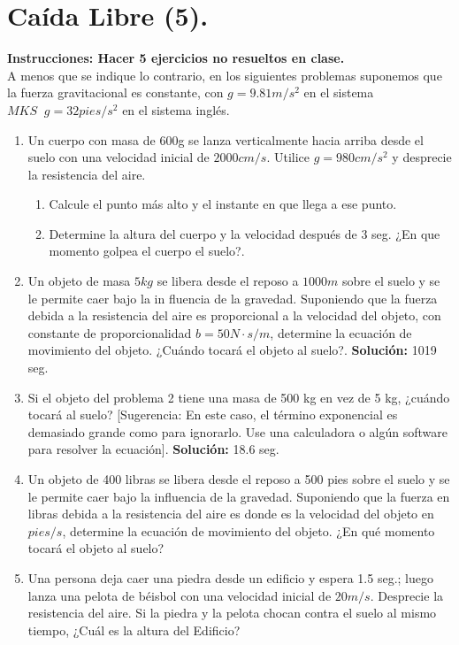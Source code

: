 \documentclass[letterpaper,10pt]{memoir}
\begin{document}
\section*{Caída Libre (5).} %
\textbf{Instrucciones: Hacer 5 ejercicios no resueltos en clase.}\\
A menos que se indique lo contrario, en los siguientes problemas suponemos que la fuerza gravitacional es constante, con \(g = 9.81 m/s ^2\) en el sistema \(MKS \;\;g = 32 pies/s ^2\) en el sistema inglés.
\begin{enumerate}
	\item Un cuerpo con masa de 600g se lanza verticalmente hacia arriba desde el suelo con una velocidad inicial de \(2000cm/s\). Utilice \(g=980cm/s ^2\) y desprecie la resistencia del aire.
		\begin{enumerate}
			\item Calcule el punto más alto y el instante en que llega a ese punto.
			\item Determine la altura del cuerpo y la velocidad después de \(3\) seg. ¿En que momento golpea el cuerpo el suelo?.
		\end{enumerate}
	\item Un objeto de masa \(5 kg\) se libera desde el reposo a \(1000 m\) sobre el suelo y se le permite caer bajo la in fluencia de la gravedad. Suponiendo que la fuerza debida a la resistencia del aire es proporcional a la velocidad del objeto, con constante de proporcionalidad \(b = 50 N \cdot s/m\), determine la ecuación de movimiento del objeto. ¿Cuándo tocará el objeto al suelo?. \textbf{Solución:} 1019 seg.
	\item Si el objeto del problema 2 tiene una masa de 500 kg en vez de 5 kg, ¿cuándo tocará al suelo? [Sugerencia: En este caso, el término exponencial es demasiado grande como para ignorarlo. Use una calculadora o algún software para resolver la ecuación]. \textbf{Solución:} 18.6 seg.
	\item Un objeto de 400 libras se libera desde el reposo a 500 pies sobre el suelo y se le permite caer bajo la influencia de la gravedad. Suponiendo que la fuerza en libras debida a la resistencia del aire es donde es la velocidad del objeto en \(pies/s\), determine la ecuación de movimiento del objeto. ¿En qué momento tocará el objeto al suelo?
	\item Una persona deja caer una piedra desde un edificio y espera 1.5 seg.; luego lanza una pelota de béisbol con una velocidad inicial de \(20m/s\). Desprecie la resistencia del aire. Si la piedra y la pelota chocan contra el suelo al mismo tiempo, ¿Cuál es la altura del Edificio?

\end{enumerate}
\end{document}
